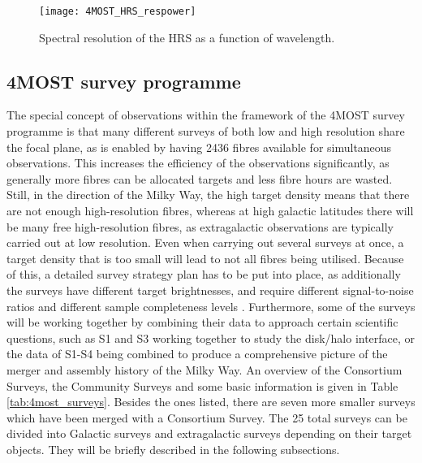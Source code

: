 \documentclass[a4paper,11pt]{article}
\begin{document}
%
\begin{figure}[h]
 \centering
 \texttt{[image: 4MOST\_HRS\_respower]}
 \caption[Spectral resolution of the HRS]{Spectral resolution of the HRS as a function of wavelength.\footnotemark}
 \label{fig:hrs_respower}
\end{figure}
%
\subsection{4MOST survey programme} \label{4most_progr}
The special concept of observations within the framework of the 4MOST survey programme is that many different surveys of both low and high resolution share the focal plane, as is enabled by having 2436 fibres available for simultaneous observations. This increases the efficiency of the observations significantly, as generally more fibres can be allocated targets and less fibre hours are wasted. Still, in the direction of the Milky Way, the high target density means that there are not enough high-resolution fibres, whereas at high galactic latitudes there will be many free high-resolution fibres, as extragalactic observations are typically carried out at low resolution. Even when carrying out several surveys at once, a target density that is too small will lead to not all fibres being utilised. Because of this, a detailed survey strategy plan has to be put into place, as additionally the surveys have different target brightnesses, and require different signal-to-noise ratios and different sample completeness levels \citep{guiglion19}. Furthermore, some of the surveys will be working together by combining their data to approach certain scientific questions, such as S1 and S3 working together to study the disk/halo interface, or the data of S1-S4 being combined to produce a comprehensive picture of the merger and assembly history of the Milky Way. An overview of the Consortium Surveys, the Community Surveys and some basic information is given in Table \ref{tab:4most_surveys}. Besides the ones listed, there are seven more smaller surveys which have been merged with a Consortium Survey. The 25 total surveys can be divided into Galactic surveys and extragalactic surveys depending on their target objects. They will be briefly described in the following subsections.
%
\end{document}

